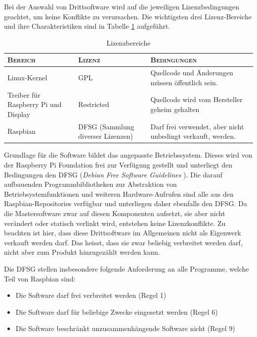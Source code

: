 Bei    der   Auswahl    von    Drittsoftware   wird    auf   die    jeweiligen
Lizenzbedingungen   geachtet,   um   keine   Konflikte   zu   verursachen. Die
wichtigsten  drei Lizenz-Bereiche  und ihre  Charakteristiken sind  in Tabelle
\ref{tab:licenseAreas} aufgef\"uhrt.

\begin{table}[h!tb]
    \centering
    \caption{Lizenzbereiche}
    \label{tab:licenseAreas}
    \small
    \begin{tabular}{>{\raggedright}p{30mm}>{\raggedright}p{30mm}p{50mm}}
        \toprule
        \textsc{Bereich} &
        \textsc{Lizenz} &
        \textsc{Bedingungen} \\
        \midrule
        Linux-Kernel &
        GPL &
        Quellcode und \"Anderungen m\"ussen \"offentlich sein. \\
        [2mm]

        \rowcolor{solarized-base2}
        Treiber f\"ur Raspberry Pi und Display &
        Restricted &
        Quellcode wird vom Hersteller geheim gehalten \\
        [2mm]

        Raspbian &
        DFSG (Sammlung diverser Lizenzen) &
        Darf frei verwendet, aber nicht unbedingt verkauft, werden. \\
        \bottomrule
    \end{tabular}
\end{table}

Grundlage  f\"ur die  Software  bildet  das angepasste  Betriebssystem. Dieses
wird  von  der Raspberry  Pi  Foundation  frei  zur Verf\"ugung  gestellt  und
unterliegt den  Bedingungen den  DFSG (\emph{Debian Free  Software Guidelines}
\cite{ref:socialContract}). Die  darauf  aufbauenden Programmbibliotheken  zur
Abstraktion  von Betriebsystemfunktionen  und weiteren  Hardware-Aufrufen sind
alle aus den Raspbian-Repositories verf\"ugbar und unterliegen daher ebenfalls
den  DFSG.   Da  die  Mastersoftware zwar  auf  diesen  Komponenten  aufsetzt,
sie  aber  nicht ver\"andert  oder  statisch  verlinkt wird,  entstehen  keine
Lizenzkonflikte. Zu beachten ist hier, dass diese Drittsoftware im Allgemeinen
nicht als Eigenwerk  verkauft werden darf. Das heisst, dass  sie zwar beliebig
verbreitet werden darf, nicht aber zum Produkt hinzugez\"ahlt werden kann.

Die DFSG stellen  insbesondere folgende Anforderung an  alle Programme, welche
Teil von Raspbian sind:

\begin{itemize}
    \tightlist
\item
    Die Software darf frei verbreitet werden (Regel 1)
\item
    Die Software darf f\"ur beliebige Zwecke eingesetzt werden (Regel 6)
\item
    Die Software beschr\"ankt unzusammenh\"angende Software nicht (Regel 9)
\end{itemize}

